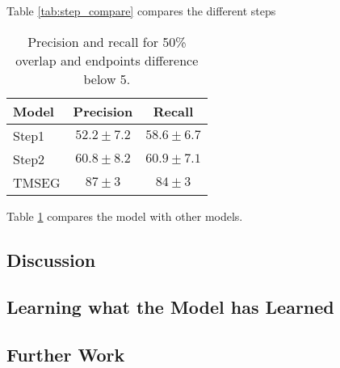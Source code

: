 Table \ref{tab:step_compare} compares the different steps

\begin{table}
	\centering 
	\begin{tabular}{l|c|c} 
		Model & Precision & Recall \\ \hline 
		Step1 & $52.2 \pm 7.2$ & $58.6 \pm 6.7$ \\ 
		Step2 & $60.8 \pm 8.2$ & $60.9 \pm 7.1$ \\ 
		TMSEG\cite{tmseg} & $87 \pm 3$ & $84 \pm 3$
	\end{tabular}
    \caption{Precision and recall for 50\% overlap and endpoints difference below 5.}
	\label{tab:pr50}
\end{table}

Table \ref{tab:pr50} compares the model with other models.

\subsection{Discussion}

\subsection{Learning what the Model has Learned}

\subsection{Further Work}

